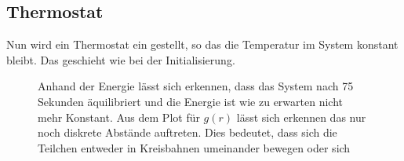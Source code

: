 \subsection*{Thermostat}
Nun wird ein Thermostat ein gestellt, so das die Temperatur im System konstant bleibt.
Das geschieht wie bei der Initialisierung.
\begin{figure}[h!]
	\centering
	\centering
	\caption{Anhand der Energie lässt sich erkennen, dass das System nach 75 Sekunden äquilibriert und die Energie ist wie zu erwarten nicht mehr Konstant. Aus dem Plot für $g(r)$ lässt sich erkennen das nur noch diskrete Abstände auftreten. Dies bedeutet, dass sich die Teilchen entweder in Kreisbahnen umeinander bewegen oder sich }
\end{figure}